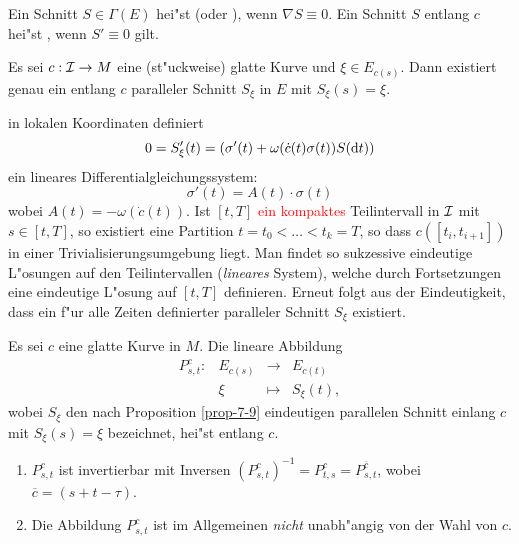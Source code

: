 \begin{Dfn}
Ein Schnitt $S \in \Gamma(E)$ hei"st  (oder ), wenn $\nabla S \equiv 0$. Ein Schnitt $S$ entlang $c$ hei"st , wenn $S' \equiv 0$ gilt.
\end{Dfn}

\begin{Prop}\label{prop-7-9}
Es sei $c: \operatorname{\mathcal{I}} \to M$ eine (st"uckweise) glatte Kurve und $\xi \in E_{c(s)}$. Dann existiert genau ein entlang $c$ paralleler Schnitt $S_\xi$ in $E$ mit $S_\xi(s) = \xi$.
\end{Prop}

\begin{bew}
in lokalen Koordinaten definiert
	\[ 0 = S_\xi'(t) = (\sigma'(t) + \omega(\dot c(t) \sigma(t)) S(\mathrm{d} t)) \]
ein lineares Differentialgleichungssystem:
	\[ \sigma'(t)  = A(t) \cdot \sigma(t) \]
wobei $A(t) = -\omega(\dot c(t))$. Ist $[t, T]$ \textcolor{red}{ein kompaktes} Teilintervall in $\operatorname{\mathcal{I}}$ mit $s \in [t, T]$, so existiert eine Partition $t = t_0 < \ldots < t_k = T$, so dass $c([t_i, t_{i+1}])$ in einer Trivialisierungsumgebung liegt. Man findet so sukzessive eindeutige L"osungen auf den Teilintervallen (\emph{lineares} System), welche durch Fortsetzungen eine eindeutige L"osung auf $[t, T]$ definieren. Erneut folgt aus der Eindeutigkeit, dass ein f"ur alle Zeiten definierter paralleler Schnitt $S_\xi$ existiert.
\end{bew}

\begin{Dfn}
Es sei $c$ eine glatte Kurve in $M$. Die lineare Abbildung
	\[\begin{array}{cccc} P_{s,t}^c: & E_{c(s)} &\to& E_{c(t)} \\
		& \xi &\mapsto& S_\xi(t), \end{array}\]
wobei $S_\xi$ den nach Proposition \ref{prop-7-9} eindeutigen parallelen Schnitt einlang $c$ mit $S_\xi(s) = \xi$ bezeichnet, hei"st  entlang $c$.
\end{Dfn}

\begin{bem}\begin{enumerate}[label=\arabic*),leftmargin=*]
\item
	$P_{s,t}^c$ ist invertierbar mit Inversen $(P_{s,t}^c)^{-1} = P_{t,s}^c = P_{s,t}^{\overline c}$, wobei $\overline c = (s+t-\tau)$.
\item
	Die Abbildung $P_{s,t}^c$ ist im Allgemeinen \emph{nicht} unabh"angig von der Wahl von $c$.
\end{enumerate}\end{bem}

